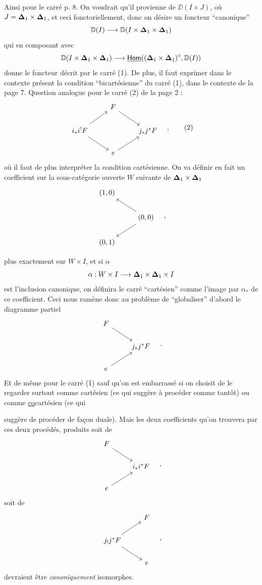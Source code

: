 Ainsi pour le carré p. 8. On voudrait qu'il provienne de $\DD(I \times J)$, où $J = \boldsymbol{\Delta}_1 \times \boldsymbol{\Delta}_1$, et ceci fonctoriellement, donc on désire un foncteur “canonique”
\[ \mathbb{D}(I) \longrightarrow \mathbb{D}(I \times \boldsymbol{\Delta}_1 \times \boldsymbol{\Delta}_1) \]
qui en composant avec
\[ \mathbb{D}(I \times \boldsymbol{\Delta}_1 \times \boldsymbol{\Delta}_1) \longrightarrow \underline{\mathsf{Hom}}((\boldsymbol{\Delta}_1 \times \boldsymbol{\Delta}_1)^{\circ}, \mathbb{D}(I)) \]
donne le foncteur décrit par le carré (1). De plus, il faut exprimer dans le contexte présent la condition “bicartésienne” du carré (1), dans le contexte de la page 7. Question analogue pour le carré (2) de la page 2 :
\[
\begin{tikzcd}
& F \arrow[dr] & \\
i_*i^!F \arrow[ur] \arrow[dr] & & j_*j^*F \\
& e \arrow[ur] &
\end{tikzcd}
\quad ,
\tag*{(2)}
\]
où il faut de plus interpréter la condition cartésienne. On va définir en fait un coefficient sur la sous-catégorie ouverte $W$ suivante de $\boldsymbol{\Delta}_1 \times \boldsymbol{\Delta}_1$
\[
\begin{tikzcd}
(1,0) & \\
& (0,0) \arrow[ul] \arrow[dl] \\
(0,1) &
\end{tikzcd}
\quad ,
\]


plus exactement sur $W \times I$, et si $\alpha$
\[ \alpha : W \times I \longrightarrow \boldsymbol{\Delta}_1 \times \boldsymbol{\Delta}_1 \times I \]
est l'inclusion canonique, on définira le carré “cartésien” comme l'image par $\alpha_*$ de ce coefficient. Ceci nous ramène donc au problème de “globaliser” d'abord le diagramme partiel
\[
\begin{tikzcd}
F \arrow[dr] & \\
& j_*j^*F \\
e \arrow[ur] &
\end{tikzcd}
\quad .
\]
Et de même pour le carré (1) sauf qu'on est embarrassé si on choisit de le regarder surtout comme cartésien (ce qui suggère à procéder comme tantôt) ou comme \underline{co}cartésien (ce qui %

\noindent suggère de procéder de façon duale). Mais les deux coefficients qu’on trouvera par ces deux procédés, produits soit de
\[
\begin{tikzcd}
F \arrow[dr] & \\
 & i_*i^*F \\
e \arrow[ur] &
\end{tikzcd}
\quad ,
\]
soit de
\[
\begin{tikzcd}
 & F \\
j_!j^*F \arrow[ur] \arrow[dr] & \\
 & e
\end{tikzcd}
\quad ,
\]
devraient être \textit{canoniquement} isomorphes.

